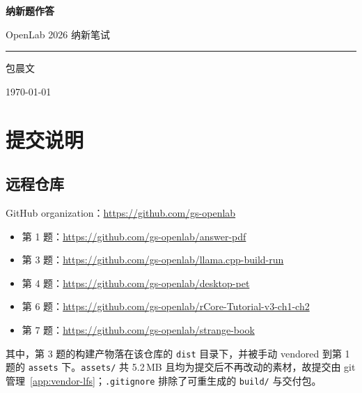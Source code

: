 \documentclass[a4paper, 12pt, linespread=1.35]{ctexart}   %
\begin{document}
\thispagestyle{plain}
\begingroup
  \centering
  {\LARGE\bfseries\heiti 纳新题作答\par}
  \vspace{0.4em}
  {\large\color{accent}OpenLab 2026 纳新笔试\par}
  \vspace{1.4em}
  {\color{accent}\rule{0.6\linewidth}{0.6pt}\par}
  \vspace{0.8em}
  {\large 包晨文\par}
  \vspace{0.3em}
  {\small\today\par}
\endgroup
\vspace{1.5em}

\setcounter{tocdepth}{2}
\tableofcontents
\clearpage

\section{提交说明}
\subsection{远程仓库}
\label{subsec:repos}
GitHub organization：\url{https://github.com/gs-openlab}

\begin{itemize}
  \item 第 1 题：\url{https://github.com/gs-openlab/answer-pdf}
  \item 第 3 题：\url{https://github.com/gs-openlab/llama.cpp-build-run}
  \item 第 4 题：\url{https://github.com/gs-openlab/desktop-pet}
  \item 第 6 题：\url{https://github.com/gs-openlab/rCore-Tutorial-v3-ch1-ch2}
  \item 第 7 题：\url{https://github.com/gs-openlab/strange-book}
\end{itemize}
其中，第 3 题的构建产物落在该仓库的 \texttt{dist} 目录下，并被手动 vendored 到第 1 题的 \texttt{assets} 下。\texttt{assets/} 共 5.2\,MB 且均为提交后不再改动的素材，故提交由 git 管理~\ref{app:vendor-lfs}；\texttt{.gitignore} 排除了可重生成的 \texttt{build/} 与交付包。
\end{document}
